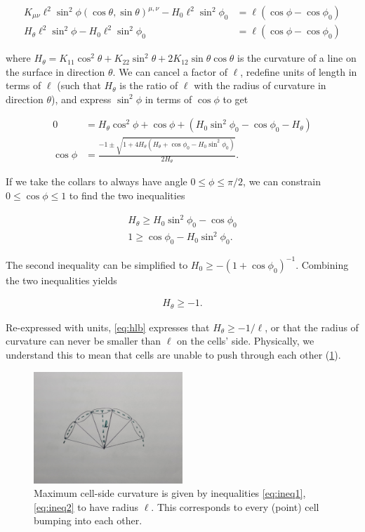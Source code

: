 \begin{align*}
    K_{\mu\nu}\ell^2\sin^2\phi (\cos\theta, \sin\theta)^{\mu,\nu} - H_0 \ell^2\sin^2\phi_0 &= \ell(\cos\phi - \cos\phi_0) \\
    H_\theta \ell^2\sin^2\phi - H_0 \ell^2\sin^2\phi_0 &= \ell(\cos\phi - \cos\phi_0)
\end{align*}

\noindent where $H_\theta = K_{11}\cos^2\theta + K_{22}\sin^2\theta + 2K_{12}\sin\theta\cos\theta$ is the curvature of a line on the surface in direction $\theta$. 
We can cancel a factor of $\ell$, redefine units of length in terms of $\ell$ (such that $H_\theta$ is the ratio of $\ell$ with the radius of curvature in direction $\theta$), and express $\sin^2\phi$ in terms of $\cos\phi$ to get

\begin{align*}
    0 &= H_\theta \cos^2\phi + \cos\phi + (H_0\sin^2\phi_0 - \cos\phi_0 - H_\theta) \\
    \cos\phi &= \frac{-1 \pm \sqrt{1 + 4H_\theta (H_\theta + \cos\phi_0 - H_0\sin^2\phi_0)}}{2H_\theta}.
\end{align*}

If we take the collars to always have angle $0 \leq \phi \leq \pi/2$, we can constrain $0 \leq \cos\phi \leq 1$ to find the two inequalities 

\begin{align}
    H_\theta \geq H_0 \sin^2\phi_0 - \cos\phi_0 \label{eq:ineq1}\\
    1 \geq \cos\phi_0 - H_0 \sin^2\phi_0. \label{eq:ineq2}
\end{align}

\noindent The second inequality can be simplified to $H_0 \geq -(1+\cos\phi_0)^{-1}$. 
Combining the two inequalities yields 

\begin{align}
    H_\theta \geq -1. \label{eq:hlb}
\end{align}

\noindent Re-expressed with units, \cref{eq:hlb} expresses that $H_\theta \geq -1/\ell$, or that the radius of curvature can never be smaller than $\ell$ on the cells' side. 
Physically, we understand this to mean that cells are unable to push through each other (\cref{fig:maxcurv}).

\begin{figure}[hbtp]
    \centering
    \includegraphics[width=0.5\textwidth]{arc.jpg}
    \caption[Bounded sheet curvature permitted in the continuous sheet description]{Maximum cell-side curvature is given by inequalities \ref{eq:ineq1}, \ref{eq:ineq2} to have radius $\ell$. This corresponds to every (point) cell bumping into each other.}
    \label{fig:maxcurv}
\end{figure}

